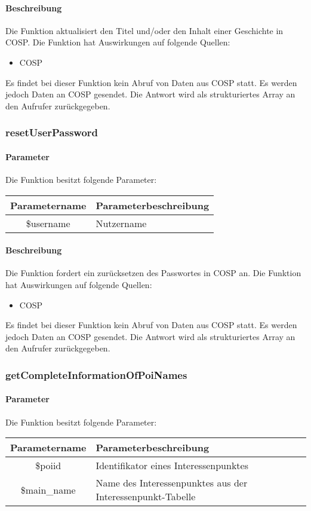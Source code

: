 \paragraph{Beschreibung} Die Funktion aktualisiert den Titel und/oder den Inhalt einer Geschichte in {\glqq COSP\grqq}. Die Funktion hat Auswirkungen auf folgende Quellen:
\begin{itemize}
	\item COSP
\end{itemize}
Es findet bei dieser Funktion kein Abruf von Daten aus {\glqq COSP\grqq} statt. Es werden jedoch Daten an {\glqq COSP\grqq} gesendet. Die Antwort wird als strukturiertes Array an den Aufrufer zurückgegeben.
\subsubsection{resetUserPassword}
\paragraph{Parameter} Die Funktion besitzt folgende Parameter:
\begin{table}[H]
	\begin{tabular}{|c|p{11cm}|}
		\hline
		\textbf{Parametername} & \textbf{Parameterbeschreibung} \\ \hline
		\$username & Nutzername \\ \hline
	\end{tabular}
\end{table}
\paragraph{Beschreibung} Die Funktion fordert ein zurücksetzen des Passwortes in {\glqq COSP\grqq} an. Die Funktion hat Auswirkungen auf folgende Quellen:
\begin{itemize}
	\item COSP
\end{itemize}
Es findet bei dieser Funktion kein Abruf von Daten aus {\glqq COSP\grqq} statt. Es werden jedoch Daten an {\glqq COSP\grqq} gesendet. Die Antwort wird als strukturiertes Array an den Aufrufer zurückgegeben.
\subsubsection{getCompleteInformationOfPoiNames}
\paragraph{Parameter} Die Funktion besitzt folgende Parameter:
\begin{table}[H]
	\begin{tabular}{|c|p{11cm}|}
		\hline
		\textbf{Parametername} & \textbf{Parameterbeschreibung} \\ \hline
		\$poiid      & Identifikator eines Interessenpunktes \\ \hline
		\$main\_name & Name des Interessenpunktes aus der Interessenpunkt-Tabelle \\ \hline
	\end{tabular}
\end{table}
